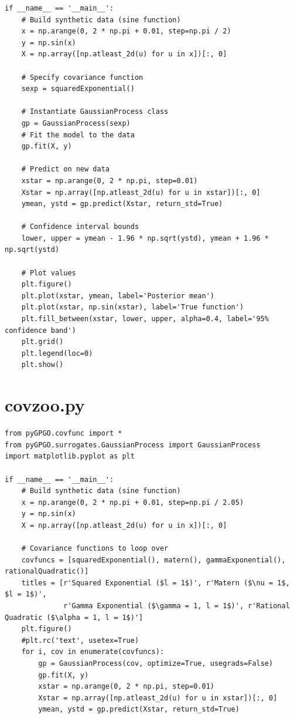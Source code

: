 \documentclass[10pt,a4paper,twoside]{book}
\begin{document}
\begin{appendices}
\begin{verbatim}
if __name__ == '__main__':
    # Build synthetic data (sine function)
    x = np.arange(0, 2 * np.pi + 0.01, step=np.pi / 2)
    y = np.sin(x)
    X = np.array([np.atleast_2d(u) for u in x])[:, 0]

    # Specify covariance function
    sexp = squaredExponential()

    # Instantiate GaussianProcess class
    gp = GaussianProcess(sexp)
    # Fit the model to the data
    gp.fit(X, y)

    # Predict on new data
    xstar = np.arange(0, 2 * np.pi, step=0.01)
    Xstar = np.array([np.atleast_2d(u) for u in xstar])[:, 0]
    ymean, ystd = gp.predict(Xstar, return_std=True)

    # Confidence interval bounds
    lower, upper = ymean - 1.96 * np.sqrt(ystd), ymean + 1.96 * np.sqrt(ystd)

    # Plot values
    plt.figure()
    plt.plot(xstar, ymean, label='Posterior mean')
    plt.plot(xstar, np.sin(xstar), label='True function')
    plt.fill_between(xstar, lower, upper, alpha=0.4, label='95% confidence band')
    plt.grid()
    plt.legend(loc=0)
    plt.show()
   \end{verbatim}
   
\section{covzoo.py}
\label{covzoo}
   \begin{verbatim}
from pyGPGO.covfunc import *
from pyGPGO.surrogates.GaussianProcess import GaussianProcess
import matplotlib.pyplot as plt

if __name__ == '__main__':
    # Build synthetic data (sine function)
    x = np.arange(0, 2 * np.pi + 0.01, step=np.pi / 2.05)
    y = np.sin(x)
    X = np.array([np.atleast_2d(u) for u in x])[:, 0]

    # Covariance functions to loop over
    covfuncs = [squaredExponential(), matern(), gammaExponential(), rationalQuadratic()]
    titles = [r'Squared Exponential ($l = 1$)', r'Matern ($\nu = 1$, $l = 1$)',
              r'Gamma Exponential ($\gamma = 1, l = 1$)', r'Rational Quadratic ($\alpha = 1, l = 1$)']
    plt.figure()
    #plt.rc('text', usetex=True)
    for i, cov in enumerate(covfuncs):
        gp = GaussianProcess(cov, optimize=True, usegrads=False)
        gp.fit(X, y)
        xstar = np.arange(0, 2 * np.pi, step=0.01)
        Xstar = np.array([np.atleast_2d(u) for u in xstar])[:, 0]
        ymean, ystd = gp.predict(Xstar, return_std=True)


\end{verbatim}
\end{appendices}
\end{document}
